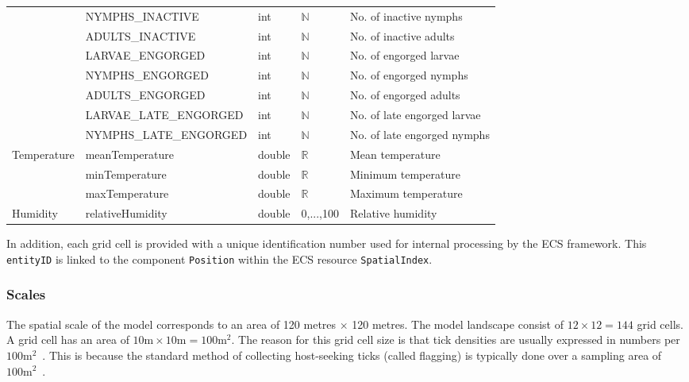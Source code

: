 \documentclass[a4paper, 11pt]{scrartcl}
\newcommand{\inlinecode}[1]{\texttt{\small #1}}
\begin{document}
\begin{table}[H]
\begin{tabularx}{\textwidth}{lllll}
							& \footnotesize{NYMPHS\_INACTIVE}	& int & $\mathbb{N}$ & \footnotesize{No. of inactive nymphs} \\
							& \footnotesize{ADULTS\_INACTIVE}	& int & $\mathbb{N}$ & \footnotesize{No. of inactive adults} \\
							& \footnotesize{LARVAE\_ENGORGED}	& int & $\mathbb{N}$ & \footnotesize{No. of engorged larvae} \\
							& \footnotesize{NYMPHS\_ENGORGED}	& int & $\mathbb{N}$ & \footnotesize{No. of engorged nymphs} \\
							& \footnotesize{ADULTS\_ENGORGED}	& int & $\mathbb{N}$ & \footnotesize{No. of engorged adults} \\
							& \tiny{LARVAE\_LATE\_ENGORGED}		& int & $\mathbb{N}$ & \footnotesize{No. of late engorged larvae} \\
							& \tiny{NYMPHS\_LATE\_ENGORGED}		& int & $\mathbb{N}$ & \footnotesize{No. of late engorged nymphs} \\
\midrule
\multirow{3}{*}{\footnotesize{Temperature}} & \small{meanTemperature}  & double  	& $\mathbb{R}$ & \footnotesize{Mean temperature} \\
							& \footnotesize{minTemperature}   & double  	& $\mathbb{R}$ & \footnotesize{Minimum temperature} \\
							& \footnotesize{maxTemperature}   & double  	& $\mathbb{R}$ & \footnotesize{Maximum temperature} \\
\footnotesize{Humidity} 	& \footnotesize{relativeHumidity} & double  	& 0,...,100 & \footnotesize{Relative humidity} \\
\bottomrule
\end{tabularx}
\end{table}

In addition, each grid cell is provided with a unique identification number used for internal processing by the ECS framework. This \inlinecode{entityID} is linked to the component \inlinecode{Position} within the ECS resource \inlinecode{SpatialIndex}.


\subsubsection{Scales}
The spatial scale of the model corresponds to an area of 120 metres $\times$ 120 metres. The model landscape consist of $12 \times 12 = 144$ grid cells. A grid cell has an area of $10 \mathrm{m} \times 10 \mathrm{m} = 100 \mathrm{m}^{2}$. The reason for this grid cell size is that tick densities are usually expressed in numbers per $100 \mathrm{m}^{2}$~\parencite[see e.g.][Table 2]{Boehnke.2015}. This is because the standard method of collecting host-seeking ticks (called flagging) is typically done over a sampling area of $100 \mathrm{m}^{2}$~\parencite{Brugger.2016, Schulz.2014}.
\end{document}
